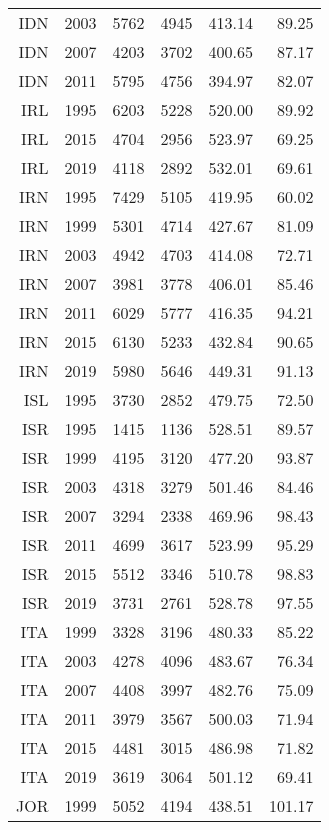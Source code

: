 \begin{longtable}{|r|r|r|r|r|r|}
    IDN   & 2003  & 5762  & 4945  & 413.14 & 89.25 \\
    IDN   & 2007  & 4203  & 3702  & 400.65 & 87.17 \\
    IDN   & 2011  & 5795  & 4756  & 394.97 & 82.07 \\
    IRL   & 1995  & 6203  & 5228  & 520.00 & 89.92 \\
    IRL   & 2015  & 4704  & 2956  & 523.97 & 69.25 \\
    IRL   & 2019  & 4118  & 2892  & 532.01 & 69.61 \\
    IRN   & 1995  & 7429  & 5105  & 419.95 & 60.02 \\
    IRN   & 1999  & 5301  & 4714  & 427.67 & 81.09 \\
    IRN   & 2003  & 4942  & 4703  & 414.08 & 72.71 \\
    IRN   & 2007  & 3981  & 3778  & 406.01 & 85.46 \\
    IRN   & 2011  & 6029  & 5777  & 416.35 & 94.21 \\
    IRN   & 2015  & 6130  & 5233  & 432.84 & 90.65 \\
    IRN   & 2019  & 5980  & 5646  & 449.31 & 91.13 \\
    ISL   & 1995  & 3730  & 2852  & 479.75 & 72.50 \\
    ISR   & 1995  & 1415  & 1136  & 528.51 & 89.57 \\
    ISR   & 1999  & 4195  & 3120  & 477.20 & 93.87 \\
    ISR   & 2003  & 4318  & 3279  & 501.46 & 84.46 \\
    ISR   & 2007  & 3294  & 2338  & 469.96 & 98.43 \\
    ISR   & 2011  & 4699  & 3617  & 523.99 & 95.29 \\
    ISR   & 2015  & 5512  & 3346  & 510.78 & 98.83 \\
    ISR   & 2019  & 3731  & 2761  & 528.78 & 97.55 \\
    ITA   & 1999  & 3328  & 3196  & 480.33 & 85.22 \\
    ITA   & 2003  & 4278  & 4096  & 483.67 & 76.34 \\
    ITA   & 2007  & 4408  & 3997  & 482.76 & 75.09 \\
    ITA   & 2011  & 3979  & 3567  & 500.03 & 71.94 \\
    ITA   & 2015  & 4481  & 3015  & 486.98 & 71.82 \\
    ITA   & 2019  & 3619  & 3064  & 501.12 & 69.41 \\
    JOR   & 1999  & 5052  & 4194  & 438.51 & 101.17 \\

\end{longtable}
